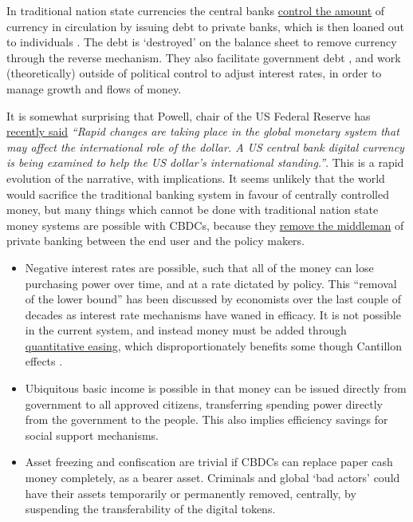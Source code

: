\begin{itemize}
In traditional nation state currencies the central banks \href{https://www.bankofengland.co.uk/markets/bank-of-england-market-operations-guide}{control the amount} of currency in circulation by issuing debt to private banks, which is then loaned out to individuals \cite{wang2021central}. The debt is `destroyed' on the balance sheet to remove currency through the reverse mechanism. They also facilitate government debt \cite{filardo2012central}, and work (theoretically) outside of political control to adjust interest rates, in order to manage growth and flows of money. \par
It is somewhat surprising that Powell, chair of the US Federal Reserve has \href{https://www.federalreserve.gov/newsevents/speech/powell20220617a.htm}{recently said} \textit{``Rapid changes are taking place in the global monetary system that may affect the international role of the dollar. A US central bank digital currency is being examined to help the US dollar's international standing.''}. This is a rapid evolution of the narrative, with implications. It seems unlikely that the world would sacrifice the traditional banking system in favour of centrally controlled money, but many things which cannot be done with traditional nation state money systems are possible with CBDCs, because they \href{https://voxeu.org/article/benefits-central-bank-digital-currency}{remove the middleman} of private banking between the end user and the policy makers. 
\begin{itemize}
\item Negative interest rates are possible, such that all of the money can lose purchasing power over time, and at a rate dictated by policy. This ``removal of the lower bound'' has been discussed by economists over the last couple of decades as interest rate mechanisms have waned in efficacy. It is not possible in the current system, and instead money must be added through \href{https://www.bankofengland.co.uk/monetary-policy/quantitative-easing}{quantitative easing}, which disproportionately benefits some though Cantillon effects \cite{cantillon1756essai, bordo1983some}.  
\item Ubiquitous basic income is possible in that money can be issued directly from government to all approved citizens, transferring spending power directly from the government to the people. This also implies efficiency savings for social support mechanisms.
\item Asset freezing and confiscation are trivial if CBDCs can replace paper cash money completely, as a bearer asset. Criminals and global `bad actors' could have their assets temporarily or permanently removed, centrally, by suspending the transferability of the digital tokens.

\end{itemize}
\end{itemize}
